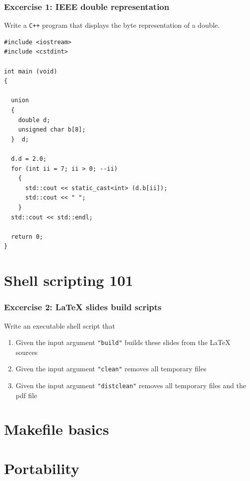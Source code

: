 \documentclass[10pt,c,ignorenonframetext]{beamer}
\begin{document}
\begin{frame}[fragile]
\frametitle{Excercise 1: IEEE double representation}

Write a {\tt C++} program that displays the byte 
representation of a double.

{\scriptsize
\begin{lstlisting}
#include <iostream>
#include <cstdint>

int main (void)
{

  union 
  {
    double d;
    unsigned char b[8];
  }  d;

  d.d = 2.0;
  for (int ii = 7; ii > 0; --ii)
    {      
      std::cout << static_cast<int> (d.b[ii]);
      std::cout << " ";
    }
  std::cout << std::endl;

  return 0;
}
\end{lstlisting}}
\end{frame}

\section{Shell scripting 101}

\begin{frame}[fragile]
\frametitle{Excercise 2: LaTeX slides build scripts}
Write an executable shell script that
\begin{enumerate}
\item Given the input argument {\tt "build"} builds these slides from the LaTeX sources
\item Given the input argument {\tt "clean"} removes all temporary files
\item Given the input argument {\tt "distclean"} removes all temporary files and the pdf file
\end{enumerate}
\end{frame}

\section{Makefile basics}

\section{Portability}
\frame{}
\end{document}
